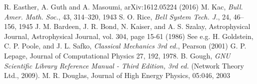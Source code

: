 \documentclass[12pt]{article}
\begin{document}
\begin{thebibliography}{99}
 R. Easther, A. Guth and A. Masoumi, arXiv:1612.05224 (2016)
 M. Kac, \emph{Bull. Amer. Math. Soc.}, 43, 314–320, 1943
  S. O. Rice, \emph{Bell System Tech. J.}, 24, 46--156, 1945
 J. M. Bardeen, J. R. Bond, N. Kaiser, and A. S. Szalay, Astrophysical Journal, Astrophysical Journal, vol. 304, page 15-61 (1986)
 See e.g. H. Goldstein, C. P. Poole, and J. L. Safko, \emph{Classical Mechanics 3rd ed.}, Pearson (2001)
 G. P. Lepage, Journal of Computational Physics 27, 192, 1978.
 B. Gough, \emph{GNU Scientific Library Reference Manual - Third Edition, 3rd ed.} (Network Theory Ltd., 2009).
 M. R. Douglas, Journal of High Energy Physics, 05:046, 2003
\end{thebibliography}
\end{document}
